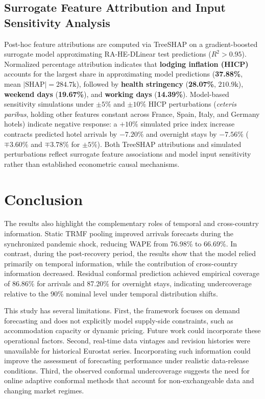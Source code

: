 \documentclass[sigconf]{acmart}
\begin{document}
\subsection{Surrogate Feature Attribution and Input Sensitivity Analysis}
\label{sec:results_xai}
Post-hoc feature attributions are computed via TreeSHAP \cite{lundberg2020treeshap} on a gradient-boosted surrogate model approximating RA-HE-DLinear test predictions ($R^2 > 0.95$). Normalized percentage attribution indicates that \textbf{lodging inflation (HICP)} accounts for the largest share in approximating model predictions (\textbf{37.88\%}, mean $|\text{SHAP}|=284.7\text{k}$), followed by \textbf{health stringency} (\textbf{28.07\%}, $210.9\text{k}$), \textbf{weekend days} (\textbf{19.67\%}), and \textbf{working days} (\textbf{14.39\%}). Model-based sensitivity simulations under $\pm 5\%$ and $\pm 10\%$ HICP perturbations (\emph{ceteris paribus}, holding other features constant across France, Spain, Italy, and Germany hotels) indicate negative response: a $+10\%$ simulated price index increase contracts predicted hotel arrivals by \textbf{$-7.20\%$} and overnight stays by \textbf{$-7.56\%$} ($\mp 3.60\%$ and $\mp 3.78\%$ for $\pm 5\%$). Both TreeSHAP attributions and simulated perturbations reflect surrogate feature associations and model input sensitivity rather than established econometric causal mechanisms.

\enlargethispage{75pt}
\section{Conclusion}
\label{sec:conclusion}
The results also highlight the complementary roles of temporal and cross-country information. Static TRMF pooling improved arrivals forecasts during the synchronized pandemic shock, reducing WAPE from 76.98\% to 66.69\%. In contrast, during the post-recovery period, the results show that the model relied primarily on temporal information, while the contribution of cross-country information decreased. Residual conformal prediction achieved empirical coverage of 86.86\% for arrivals and 87.20\% for overnight stays, indicating undercoverage relative to the 90\% nominal level under temporal distribution shifts. 

This study has several limitations. First, the framework focuses on demand forecasting and does not explicitly model supply-side constraints, such as accommodation capacity or dynamic pricing. Future work could incorporate these operational factors. Second, real-time data vintages and revision histories were unavailable for historical Eurostat series. Incorporating such information could improve the assessment of forecasting performance under realistic data-release conditions. Third, the observed conformal undercoverage suggests the need for online adaptive conformal methods that account for non-exchangeable data and changing market regimes.
\end{document}
